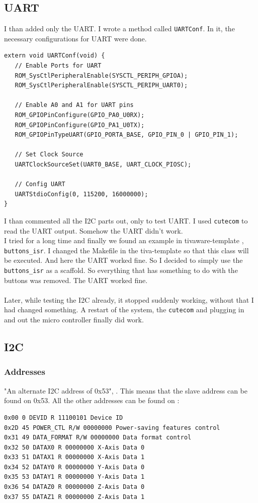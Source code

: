 \documentclass[12pt]{article}
\begin{document}
\subsection{UART}
I than added only the UART.  I wrote a method called \texttt{UARTConf}. In it, the necessary configurations for UART were done. 
\begin{lstlisting}    
extern void UARTConf(void) {
   // Enable Ports for UART
   ROM_SysCtlPeripheralEnable(SYSCTL_PERIPH_GPIOA);
   ROM_SysCtlPeripheralEnable(SYSCTL_PERIPH_UART0);

   // Enable A0 and A1 for UART pins
   ROM_GPIOPinConfigure(GPIO_PA0_U0RX);
   ROM_GPIOPinConfigure(GPIO_PA1_U0TX);
   ROM_GPIOPinTypeUART(GPIO_PORTA_BASE, GPIO_PIN_0 | GPIO_PIN_1);

   // Set Clock Source
   UARTClockSourceSet(UART0_BASE, UART_CLOCK_PIOSC);

   // Config UART
   UARTStdioConfig(0, 115200, 16000000);
}
\end{lstlisting}    
I than commented all the I2C parts out, only to test UART. 
I used \texttt{cutecom} to read the UART output. Somehow the UART didn't work.  \\
I tried for a long time and finally we found an example in tivaware-template \cite{tivatemp},  \texttt{buttons\_isr}.
I changed the Makefile in the tiva-template so that this class will be executed. And here the UART worked fine.
So I decided to simply use the \texttt{buttons\_isr} as a scaffold. So everything that has something to do with the buttons was removed. The UART worked fine.
\\ \\
Later, while testing the I2C already, it stopped suddenly working, without that I had changed something. A restart of the system, the \texttt{cutecom} and plugging in and out the micro controller finally did work.  

\newpage
\subsection{I2C}
\subsubsection{Addresses}
"An alternate I2C address of 0x53", \cite[page 18]{datasheetADXL}. This means that the slave address can be found on 0x53. All the other addresses can be found on \cite[page 22]{datasheetADXL}:
\begin{lstlisting}    
0x00 0 DEVID R 11100101 Device ID
0x2D 45 POWER_CTL R/W 00000000 Power-saving features control
0x31 49 DATA_FORMAT R/W 00000000 Data format control
0x32 50 DATAX0 R 00000000 X-Axis Data 0
0x33 51 DATAX1 R 00000000 X-Axis Data 1
0x34 52 DATAY0 R 00000000 Y-Axis Data 0
0x35 53 DATAY1 R 00000000 Y-Axis Data 1
0x36 54 DATAZ0 R 00000000 Z-Axis Data 0
0x37 55 DATAZ1 R 00000000 Z-Axis Data 1
\end{lstlisting}    
\end{document}
